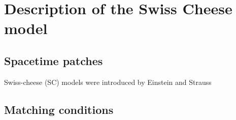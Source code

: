 \chapter{Description of the Swiss Cheese model}

\section{Spacetime patches}

Swiss-cheese (SC) models were introduced by Einstein and Strauss

\section{Matching conditions}

